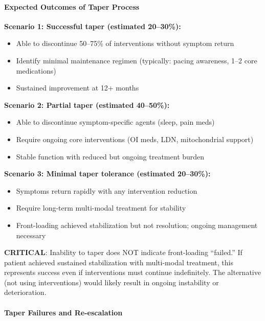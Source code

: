 \paragraph{Expected Outcomes of Taper Process}

\begin{recommendation}
\label{rec:taper-outcomes}

\textbf{Scenario 1: Successful taper (estimated 20--30\%):}
\begin{itemize}
    \item Able to discontinue 50--75\% of interventions without symptom return
    \item Identify minimal maintenance regimen (typically: pacing awareness, 1--2 core medications)
    \item Sustained improvement at 12+ months
\end{itemize}

\textbf{Scenario 2: Partial taper (estimated 40--50\%):}
\begin{itemize}
    \item Able to discontinue symptom-specific agents (sleep, pain meds)
    \item Require ongoing core interventions (OI meds, LDN, mitochondrial support)
    \item Stable function with reduced but ongoing treatment burden
\end{itemize}

\textbf{Scenario 3: Minimal taper tolerance (estimated 20--30\%):}
\begin{itemize}
    \item Symptoms return rapidly with any intervention reduction
    \item Require long-term multi-modal treatment for stability
    \item Front-loading achieved stabilization but not resolution; ongoing management necessary
\end{itemize}

\textbf{CRITICAL}: Inability to taper does NOT indicate front-loading ``failed.'' If patient achieved sustained stabilization with multi-modal treatment, this represents success even if interventions must continue indefinitely. The alternative (not using interventions) would likely result in ongoing instability or deterioration.
\end{recommendation}

\paragraph{Taper Failures and Re-escalation}

